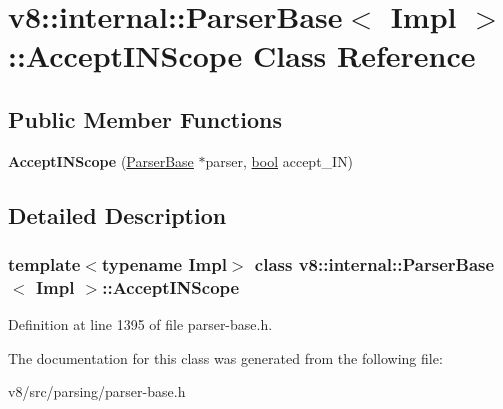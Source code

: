 \hypertarget{classv8_1_1internal_1_1ParserBase_1_1AcceptINScope}{}\section{v8\+:\+:internal\+:\+:Parser\+Base$<$ Impl $>$\+:\+:Accept\+I\+N\+Scope Class Reference}
\label{classv8_1_1internal_1_1ParserBase_1_1AcceptINScope}
\subsection*{Public Member Functions}
\begin{DoxyCompactItemize}
\item 
\mbox{\label{classv8_1_1internal_1_1ParserBase_1_1AcceptINScope_a7ccadad61043ef45927641f850a6a9ab}} 
{\bfseries Accept\+I\+N\+Scope} (\mbox{\hyperlink{classv8_1_1internal_1_1ParserBase}{Parser\+Base}} $\ast$parser, \mbox{\hyperlink{classbool}{bool}} accept\+\_\+\+IN)
\end{DoxyCompactItemize}


\subsection{Detailed Description}
\subsubsection*{template$<$typename Impl$>$\newline
class v8\+::internal\+::\+Parser\+Base$<$ Impl $>$\+::\+Accept\+I\+N\+Scope}



Definition at line 1395 of file parser-\/base.\+h.



The documentation for this class was generated from the following file\+:\begin{DoxyCompactItemize}
\item 
v8/src/parsing/parser-\/base.\+h\end{DoxyCompactItemize}
